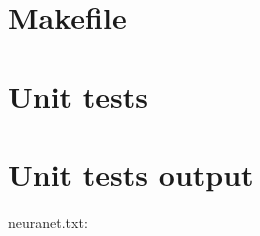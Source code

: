 \section{Makefile}

\begin{scriptsize}
\begin{ttfamily}

\end{ttfamily}
\end{scriptsize}

\section{Unit tests}

\begin{scriptsize}
\begin{ttfamily}

\end{ttfamily}
\end{scriptsize}

\section{Unit tests output}

\begin{scriptsize}
\begin{ttfamily}

\end{ttfamily}
\end{scriptsize}

neuranet.txt:\\
\begin{scriptsize}
\begin{ttfamily}

\end{ttfamily}
\end{scriptsize}

